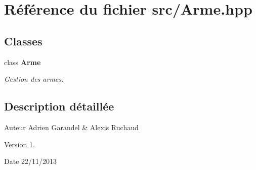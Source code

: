 \section{Référence du fichier src/\-Arme.hpp}
\label{_arme_8hpp}
\subsection*{Classes}
\begin{DoxyCompactItemize}
\item 
class {\bf Arme}
\begin{DoxyCompactList}\small\item\em Gestion des armes. \end{DoxyCompactList}\end{DoxyCompactItemize}


\subsection{Description détaillée}
\begin{DoxyAuthor}{Auteur}
Adrien Garandel \& Alexis Ruchaud 
\end{DoxyAuthor}
\begin{DoxyVersion}{Version}
1. 
\end{DoxyVersion}
\begin{DoxyDate}{Date}
22/11/2013 
\end{DoxyDate}
